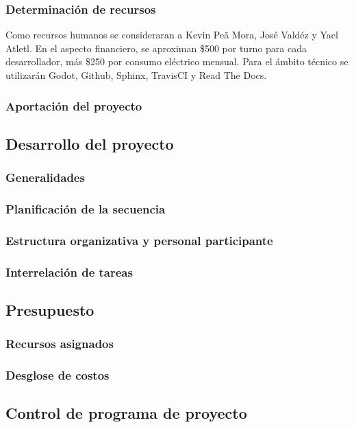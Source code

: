 \documentclass[]{article}
\begin{document}
\subsubsection{Determinaci\'on de recursos}
Como recursos humanos se consideraran a Kevin Pe\~a Mora, Jos\'e Vald\'ez y Yael Atletl. En el aspecto financiero, se aproximan \$500 por turno para cada desarrollador, m\'as \$250 por consumo el\'ectrico mensual. 
Para el \'ambito t\'ecnico se utilizar\'an Godot, Github, Sphinx, TravisCI y Read The Docs.

\subsubsection{Aportaci\'on del proyecto}

\subsection{Desarrollo del proyecto} %
\subsubsection{Generalidades}
\subsubsection{Planificaci\'on de la secuencia}
\subsubsection{Estructura organizativa y personal participante}
\subsubsection{Interrelaci\'on de tareas}

\subsection{Presupuesto}
\subsubsection{Recursos asignados}
\subsubsection{Desglose de costos}

\subsection{Control de programa de proyecto} %
\end{document}
